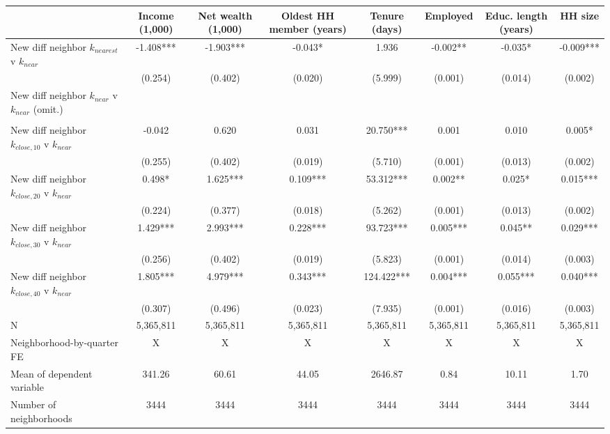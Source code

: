 \begin{tabular}[t]{lccccccc}
\toprule
  & Income (1,000) & Net wealth (1,000) & Oldest HH member (years) & Tenure (days) & Employed & Educ. length (years) & HH size\\
\midrule
New diff neighbor $k_{nearest}$ v $k_{near}$ & -1.408*** & -1.903*** & -0.043* & 1.936 & -0.002** & -0.035* & -0.009***\\
 & (0.254) & (0.402) & (0.020) & (5.999) & (0.001) & (0.014) & (0.002)\\
New diff neighbor $k_{near}$ v $k_{near}$ (omit.) &  &  &  &  &  &  & \\
 &  &  &  &  &  &  & \\
New diff neighbor $k_{close,10}$ v $k_{near}$ & -0.042 & 0.620 & 0.031 & 20.750*** & 0.001 & 0.010 & 0.005*\\
 & (0.255) & (0.402) & (0.019) & (5.710) & (0.001) & (0.013) & (0.002)\\
New diff neighbor $k_{close,20}$ v $k_{near}$ & 0.498* & 1.625*** & 0.109*** & 53.312*** & 0.002** & 0.025* & 0.015***\\
 & (0.224) & (0.377) & (0.018) & (5.262) & (0.001) & (0.013) & (0.002)\\
New diff neighbor $k_{close,30}$ v $k_{near}$ & 1.429*** & 2.993*** & 0.228*** & 93.723*** & 0.005*** & 0.045** & 0.029***\\
 & (0.256) & (0.402) & (0.019) & (5.823) & (0.001) & (0.014) & (0.003)\\
New diff neighbor $k_{close,40}$ v $k_{near}$ & 1.805*** & 4.979*** & 0.343*** & 124.422*** & 0.004*** & 0.055*** & 0.040***\\
 & (0.307) & (0.496) & (0.023) & (7.935) & (0.001) & (0.016) & (0.003)\\
\midrule
N & 5,365,811 & 5,365,811 & 5,365,811 & 5,365,811 & 5,365,811 & 5,365,811 & 5,365,811\\
Neighborhood-by-quarter FE & X & X & X & X & X & X & X\\
Mean of dependent variable & 341.26 & 60.61 & 44.05 & 2646.87 & 0.84 & 10.11 & 1.70\\
Number of neighborhoods & 3444 & 3444 & 3444 & 3444 & 3444 & 3444 & 3444\\
\bottomrule
\end{tabular}